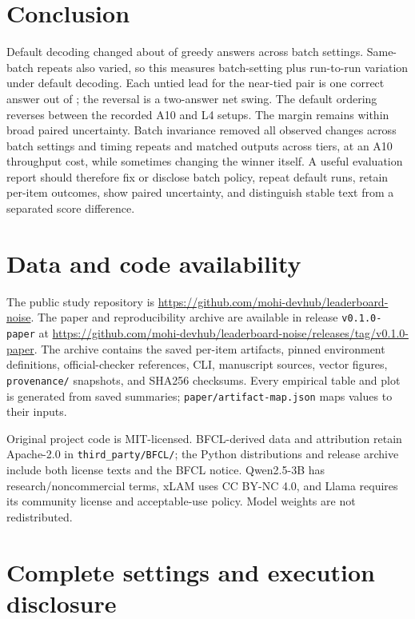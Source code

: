 \documentclass[10pt,twocolumn]{article}
\newcommand{\code}[1]{\texttt{#1}}
\begin{document}
\section{Conclusion}
Default decoding changed about \TextRounded{} of greedy answers across batch settings. Same-batch repeats also varied, so this measures batch-setting plus run-to-run variation under default decoding. Each untied lead for the near-tied pair is one correct answer out of \NItems{}; the reversal is a two-answer net swing. The default ordering reverses between the recorded A10 and L4 setups. The margin remains within broad paired uncertainty. Batch invariance removed all observed changes across batch settings and timing repeats and matched outputs across tiers, at an A10 throughput cost, while sometimes changing the winner itself. A useful evaluation report should therefore fix or disclose batch policy, repeat default runs, retain per-item outcomes, show paired uncertainty, and distinguish stable text from a separated score difference.

\section{Data and code availability}
The public study repository is \url{https://github.com/mohi-devhub/leaderboard-noise}. The paper and reproducibility archive are available in release \code{v0.1.0-paper} at \url{https://github.com/mohi-devhub/leaderboard-noise/releases/tag/v0.1.0-paper}. The archive contains the saved per-item artifacts, pinned environment definitions, official-checker references, CLI, manuscript sources, vector figures, \code{provenance/} snapshots, and SHA256 checksums. Every empirical table and plot is generated from saved summaries; \code{paper/artifact-map.json} maps values to their inputs.

Original project code is MIT-licensed. BFCL-derived data and attribution retain Apache-2.0 in \code{third\_party/BFCL/}; the Python distributions and release archive include both license texts and the BFCL notice. Qwen2.5-3B has research/noncommercial terms, xLAM uses CC BY-NC 4.0, and Llama requires its community license and acceptable-use policy. Model weights are not redistributed.



\clearpage
\appendix
\onecolumn
\section{Complete settings and execution disclosure}\label{app:settings}
\end{document}
